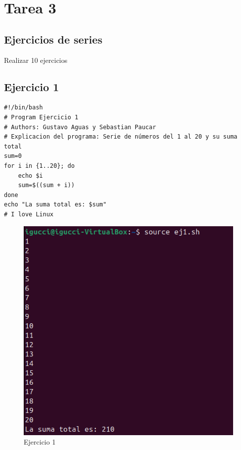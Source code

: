 \documentclass[11pt,twoside]{book}
\begin{document}
\section{Tarea 3}
\subsection{Ejercicios de series}
Realizar 10 ejercicios
\subsection{Ejercicio 1}
\begin{lstlisting}
#!/bin/bash
# Program Ejercicio 1
# Authors: Gustavo Aguas y Sebastian Paucar
# Explicacion del programa: Serie de números del 1 al 20 y su suma total
sum=0
for i in {1..20}; do
    echo $i
    sum=$((sum + i))
done
echo "La suma total es: $sum"
# I love Linux
\end{lstlisting}
\begin{figure}
    \centering
    \includegraphics[width=0.8\linewidth]{series/ej1.png}
    \caption{Ejercicio 1}
\end{figure}

\newpage
\end{document}

